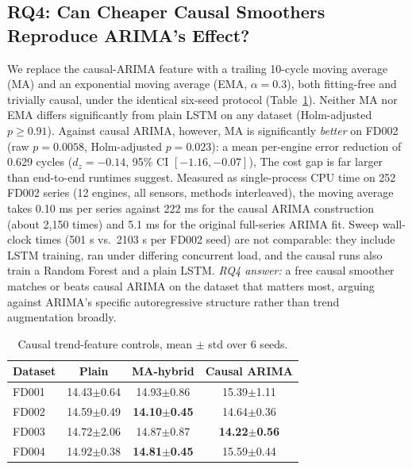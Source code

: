 \documentclass[conference]{IEEEtran}
\begin{document}
\subsection{RQ4: Can Cheaper Causal Smoothers Reproduce ARIMA's Effect?}
We replace the causal-ARIMA feature with a trailing 10-cycle moving average (MA) and an exponential moving average (EMA, $\alpha=0.3$), both fitting-free and trivially causal, under the identical six-seed protocol (Table~\ref{tab:controls}). Neither MA nor EMA differs significantly from plain LSTM on any dataset (Holm-adjusted $p\geq0.91$). Against causal ARIMA, however, MA is significantly \emph{better} on FD002 (raw $p=0.0058$, Holm-adjusted $p=0.023$): a mean per-engine error reduction of 0.629 cycles ($d_z=-0.14$, 95\% CI $[-1.16,-0.07]$), The cost gap is far larger than end-to-end runtimes suggest. Measured as single-process CPU time on 252 FD002 series (12 engines, all sensors, methods interleaved), the moving average takes 0.10 ms per series against 222 ms for the causal ARIMA construction (about 2{,}150 times) and 5.1 ms for the original full-series ARIMA fit. Sweep wall-clock times (501 s vs.\ 2103 s per FD002 seed) are not comparable: they include LSTM training, ran under differing concurrent load, and the causal runs also train a Random Forest and a plain LSTM. \emph{RQ4 answer:} a free causal smoother matches or beats causal ARIMA on the dataset that matters most, arguing against ARIMA's specific autoregressive structure rather than trend augmentation broadly.

\begin{table}[t]
\centering
\caption{Causal trend-feature controls, mean $\pm$ std over 6 seeds.}
\label{tab:controls}
\footnotesize
\begin{tabular}{lccc}
\toprule
Dataset & Plain & MA-hybrid & Causal ARIMA \\
\midrule
FD001 & 14.43{\tiny$\pm$0.64} & 14.93{\tiny$\pm$0.86} & 15.39{\tiny$\pm$1.11} \\
FD002 & 14.59{\tiny$\pm$0.49} & \textbf{14.10{\tiny$\pm$0.45}} & 14.64{\tiny$\pm$0.36} \\
FD003 & 14.72{\tiny$\pm$2.06} & 14.87{\tiny$\pm$0.87} & \textbf{14.22{\tiny$\pm$0.56}} \\
FD004 & 14.92{\tiny$\pm$0.38} & \textbf{14.81{\tiny$\pm$0.45}} & 15.59{\tiny$\pm$0.44} \\
\bottomrule
\end{tabular}
\end{table}
\end{document}
